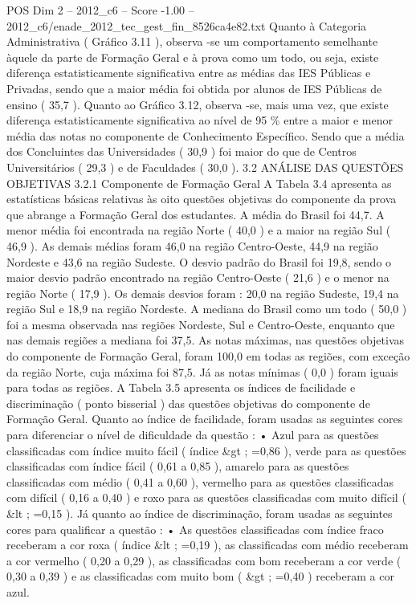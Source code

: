 \begin{textsample}{POS Dim 2 – 2012\_c6 – Score -1.00 – 2012\_c6/enade\_2012\_tec\_gest\_fin\_8526ca4e82.txt}
Quanto à Categoria Administrativa ( Gráfico 3.11 ), observa -se um comportamento semelhante àquele da parte de Formação Geral e à prova como um todo, ou seja, existe diferença estatisticamente significativa entre as médias das IES Públicas e Privadas, sendo que a maior média foi obtida por alunos de IES Públicas de ensino ( 35,7 ).
Quanto ao Gráfico 3.12, observa -se, mais uma vez, que existe diferença estatisticamente significativa ao nível de 95 \% entre a maior e menor média das notas no componente de Conhecimento Específico.
Sendo que a média dos Concluintes das Universidades ( 30,9 ) foi maior do que de Centros Universitários ( 29,3 ) e de Faculdades ( 30,0 ). 3.2 ANÁLISE DAS QUESTÕES OBJETIVAS 3.2.1 Componente de Formação Geral A Tabela 3.4 apresenta as estatísticas básicas relativas às oito questões objetivas do componente da prova que abrange a Formação Geral dos estudantes.
A média do Brasil foi 44,7.
A menor média foi encontrada na região Norte ( 40,0 ) e a maior na região Sul ( 46,9 ).
As demais médias foram 46,0 na região Centro-Oeste, 44,9 na região Nordeste e 43,6 na região Sudeste.
O desvio padrão do Brasil foi 19,8, sendo o maior desvio padrão encontrado na região Centro-Oeste ( 21,6 ) e o menor na região Norte ( 17,9 ).
Os demais desvios foram : 20,0 na região Sudeste, 19,4 na região Sul e 18,9 na região Nordeste.
A mediana do Brasil como um todo ( 50,0 ) foi a mesma observada nas regiões Nordeste, Sul e Centro-Oeste, enquanto que nas demais regiões a mediana foi 37,5.
As notas máximas, nas questões objetivas do componente de Formação Geral, foram 100,0 em todas as regiões, com exceção da região Norte, cuja máxima foi 87,5.
Já as notas mínimas ( 0,0 ) foram iguais para todas as regiões.
A Tabela 3.5 apresenta os índices de facilidade e discriminação ( ponto bisserial ) das questões objetivas do componente de Formação Geral.
Quanto ao índice de facilidade, foram usadas as seguintes cores para diferenciar o nível de dificuldade da questão : • Azul para as questões classificadas com índice muito fácil ( índice \&gt ; =0,86 ), verde para as questões classificadas com índice fácil ( 0,61 a 0,85 ), amarelo para as questões classificadas com médio ( 0,41 a 0,60 ), vermelho para as questões classificadas com difícil ( 0,16 a 0,40 ) e roxo para as questões classificadas com muito difícil ( \&lt ; =0,15 ).
Já quanto ao índice de discriminação, foram usadas as seguintes cores para qualificar a questão : • As questões classificadas com índice fraco receberam a cor roxa ( índice \&lt ; =0,19 ), as classificadas com médio receberam a cor vermelho ( 0,20 a 0,29 ), as classificadas com bom receberam a cor verde ( 0,30 a 0,39 ) e as classificadas com muito bom ( \&gt ; =0,40 ) receberam a cor azul.

\end{textsample}
